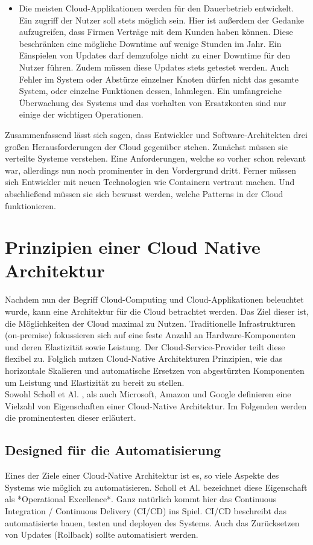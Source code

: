 \begin{itemize}
    \item Die meisten Cloud-Applikationen werden für den Dauerbetrieb entwickelt. Ein zugriff der Nutzer soll stets möglich sein. Hier ist außerdem der Gedanke aufzugreifen, dass Firmen  Verträge mit dem Kunden haben können. Diese beschränken eine mögliche Downtime auf wenige Stunden im Jahr. Ein Einspielen von Updates darf demzufolge nicht zu einer Downtime für den Nutzer führen. Zudem müssen diese Updates stets getestet werden. Auch Fehler im System oder Abstürze einzelner Knoten dürfen nicht das gesamte System, oder einzelne Funktionen dessen, lahmlegen. Ein umfangreiche Überwachung des Systems und das vorhalten von Ersatzkonten sind nur einige der wichtigen Operationen.\cite{gannon_cloud-native_2017}
\end{itemize}
Zusammenfassend lässt sich sagen, dass Entwickler und Software-Architekten drei großen Herausforderungen der Cloud gegenüber stehen. Zunächst müssen sie verteilte Systeme verstehen. Eine Anforderungen, welche so vorher schon relevant war, allerdings nun noch prominenter in den Vordergrund dritt. Ferner müssen sich Entwickler mit neuen Technologien wie Containern vertraut machen. Und abschließend müssen sie sich bewusst werden, welche Patterns in der Cloud funktionieren.

\section{Prinzipien einer Cloud Native Architektur}
Nachdem nun der Begriff Cloud-Computing und Cloud-Applikationen beleuchtet wurde, kann eine Architektur für die Cloud betrachtet werden. Das Ziel dieser ist, die Möglichkeiten der Cloud maximal zu Nutzen. Traditionelle Infrastrukturen (on-premise) fokussieren sich auf eine feste Anzahl an Hardware-Komponenten und deren Elastizität sowie Leistung. Der Cloud-Service-Provider teilt diese flexibel zu. Folglich nutzen Cloud-Native Architekturen Prinzipien, wie das horizontale Skalieren und automatische Ersetzen von abgestürzten Komponenten um Leistung und Elastizität zu bereit zu stellen.\\
Sowohl Scholl et Al. , als auch Microsoft, Amazon und Google definieren eine Vielzahl von Eigenschaften einer Cloud-Native Architektur. Im Folgenden werden die prominentesten dieser erläutert. 
\subsection{Designed für die Automatisierung}
Eines der Ziele einer Cloud-Native Architektur ist es, so viele Aspekte des Systems wie möglich zu automatisieren. Scholl et Al. bezeichnet diese Eigenschaft als *Operational Excellence*. Ganz natürlich kommt hier das Continuous Integration / Continuous Delivery (CI/CD) ins Spiel. CI/CD beschreibt das automatisierte bauen, testen und deployen des Systems. Auch das Zurücksetzen von Updates (Rollback) sollte automatisiert werden.

